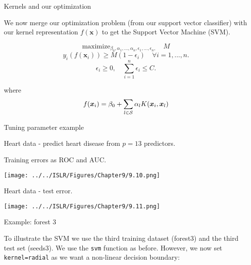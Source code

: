 \documentclass[10pt,ignorenonframetext,]{beamer}
\begin{document}
\begin{frame}

\begin{block}{Kernels and our optimization}

We now merge our optimization problem (from our support vector
classifier) with our kernel representation \(f({\boldsymbol x})\) to get
the Support Vector Machine (SVM).

\[\mathrm{maximize}_{\beta_0,\alpha_1,...,\alpha_n,\epsilon_1,...,\epsilon_n,} \quad M \]
\[y_i(f({\boldsymbol x}_i))\geq M(1-\epsilon_i) \quad  \forall i=1,...,n.\]
\[\epsilon_i\geq 0, \quad \sum_{i=1}^n \epsilon_i \leq C.\]

where
\[f({\boldsymbol x}_i)=\beta_0 +\sum_{l\in \cal{S}} \alpha_l K({\boldsymbol x}_i,{\boldsymbol x}_l)\]

\end{block}

\end{frame}

\begin{frame}

\begin{block}{Tuning parameter example}

Heart data - predict heart disease from \(p=13\) predictors.

Training errors as ROC and AUC.

\texttt{[image: ../../ISLR/Figures/Chapter9/9.10.png]}

\end{block}

\end{frame}

\begin{frame}

Heart data - test error.

\texttt{[image: ../../ISLR/Figures/Chapter9/9.11.png]}

\end{frame}

\begin{frame}[fragile]

\begin{block}{Example: forest 3}

To illustrate the SVM we use the third training dataset (forest3) and
the third test set (seeds3). We use the \texttt{svm} function as before.
However, we now set
\texttt{kernel=\textquotesingle{}radial\textquotesingle{}} as we want a
non-linear decision boundary:

\end{block}

\end{frame}
\end{document}
